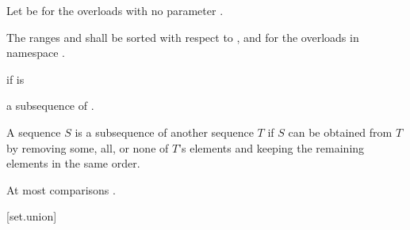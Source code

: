 \begin{itemdescr}
\begin{addedblock}
\pnum
Let  be  for the overloads with no parameter
.

\pnum
\requires
The ranges  and  shall be
sorted with respect to ,
and  for the overloads in namespace .
\end{addedblock}

\pnum
\returns
{}
if   is 
\begin{addedblock}
a subsequence of .
\begin{note}
A sequence $S$ is a subsequence of another sequence $T$ if $S$ can be obtained
from $T$ by removing some, all, or none of $T$'s elements and keeping the
remaining elements in the same order.
\end{note}
\end{addedblock}

\pnum
\complexity
At most
comparisons .
\end{itemdescr}


[set.union]{}

